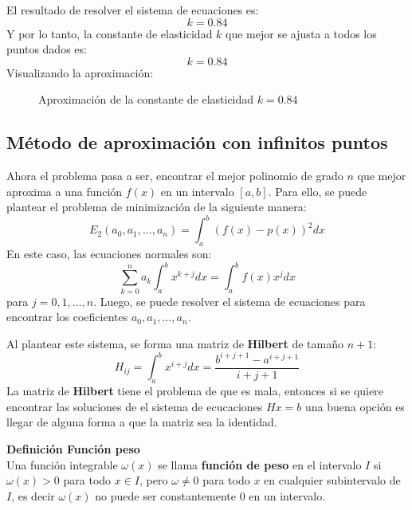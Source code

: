 \documentclass{article}
\newenvironment{definition}[2][Definición]
    { \begin{mdframed}[backgroundcolor=blue!10] \textbf{#1 #2} \\}
    {  \end{mdframed}}
\begin{document}
El resultado de resolver el sistema de ecuaciones es:
\begin{equation}
    k = 0.84
\end{equation}
Y por lo tanto, la constante de elasticidad \( k \) que mejor se ajusta a todos los puntos dados es:
\begin{equation}
    k = 0.84
\end{equation}
Visualizando la aproximación:
\begin{figure}[h]
    \centering
    \caption{Aproximación de la constante de elasticidad \( k = 0.84 \)}
    \label{fig:myplot8}
\end{figure}

\subsection[Aproximación con infinitos puntos]{Método de aproximación con infinitos puntos}
Ahora el problema pasa a ser, encontrar el mejor polinomio de grado $n$ que mejor aproxima a una función $f(x)$ en un intervalo $[a,b]$. Para ello, se puede plantear el problema de minimización de la siguiente manera:
\begin{equation}
    E_2(a_0,a_1,\dots,a_n) = \int_{a}^{b} (f(x) - p(x))^2 dx
\end{equation}
En este caso, las ecuaciones normales son:
\begin{equation}
    \sum_{k=0}^{n} a_k \int_{a}^{b} x^{k+j} dx = \int_{a}^{b} f(x)x^j dx
\end{equation}
para $j=0,1,\dots,n$. Luego, se puede resolver el sistema de ecuaciones para encontrar los coeficientes $a_0,a_1,\dots,a_n$.

Al plantear este sistema, se forma una matriz de \textbf{Hilbert} de tamaño $n+1$:
\begin{equation}
    H_{ij} = \int_{a}^{b} x^{i+j} dx = \frac{b^{i+j+1} - a^{i+j+1}}{i+j+1}
\end{equation}
La matriz de \textbf{Hilbert} tiene el problema de que es mala, entonces si se quiere encontrar las soluciones de el sistema de ecucaciones $Hx=b$ una buena opción es llegar de alguna forma a que la matriz sea la identidad.
\begin{definition}{Función peso}
    Una función integrable $\omega(x)$ se llama \textbf{función de peso} en el intervalo $I$ si $\omega(x) > 0$ para todo $x \in I$, pero $\omega \neq 0$ para todo $x$ en cualquier subintervalo de $I$, es decir $\omega(x)$ no puede ser constantemente $0$ en un intervalo.
\end{definition}
\end{document}
